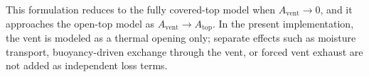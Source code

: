 This formulation reduces to the fully covered-top model when $A_{\mathrm{vent}} \rightarrow 0$, and it approaches the open-top model as $A_{\mathrm{vent}} \rightarrow A_{\mathrm{top}}$. In the present implementation, the vent is modeled as a thermal opening only; separate effects such as moisture transport, buoyancy-driven exchange through the vent, or forced vent exhaust are not added as independent loss terms.
